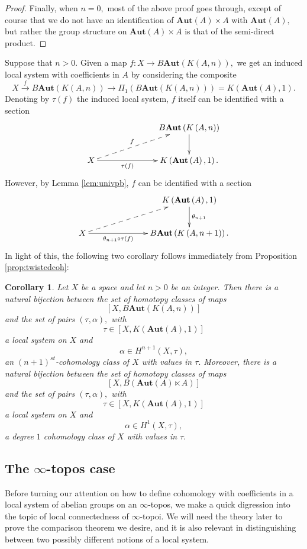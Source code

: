 \documentclass[12pt]{amsart}
\newtheorem{corollary}[dummy]{Corollary}
\theoremstyle{definition}
\renewcommand{\i}{\infty}
\def\Aut{\mathbf{Aut}}
\begin{document}
\begin{proof}
Finally, when $n=0,$ most of the above proof goes through, except of course that we do not have an identification of $\Aut\left(A\right) \times A$ with $\Aut\left(A\right),$ but rather the group structure on $\Aut\left(A\right) \times A$ is that of the semi-direct product.
\end{proof}

Suppose that $n>0.$ Given a map $f:X \to B\Aut\left(K\left(A,n\right)\right),$ we get an induced local system with coefficients in $A$ by considering the composite $$X \stackrel{f}{\longrightarrow} B\Aut\left(K\left(A,n\right)\right) \to \Pi_1\left(B\Aut\left(K\left(A,n\right)\right)\right)=K\left(\Aut\left(A\right),1\right).$$ Denoting by $\tau\left(f\right)$ the induced local system, $f$ itself can be identified with a section
$$\xymatrix@C=2.5cm{& B\Aut\left(K\left(A,n\right)\right)\ar[d]\\
X \ar@{-->}[ru]^-{f} \ar[r]_-{\tau\left(f\right)}& K\left(\Aut\left(A\right),1\right).}$$
However, by  Lemma \ref{lem:univpb}, $f$ can be identified with a section
$$\xymatrix@C=2.5cm{& K\left(\Aut\left(A\right),1\right) \ar[d]^-{\theta_{n+1}}\\
X \ar@{-->}[ru] \ar[r]_-{\theta_{n+1}\circ \tau\left(f\right)}& B\Aut\left(K\left(A,n+1\right)\right).}$$
In light of this, the following two corollary follows immediately from Proposition \ref{prop:twistedcoh}:

\begin{corollary}\label{cor:BAut rep 1}
Let $X$ be a space and let $n>0$ be an integer. Then there is a natural bijection between the set of homotopy classes of maps $$\left[X,B\Aut\left(K\left(A,n\right)\right)\right]$$ and the set of pairs $\left(\tau,\alpha\right),$ with $$\tau\in \left[X,K\left(\Aut\left(A\right),1\right)\right]$$ a local system on $X$ and $$\alpha \in H^{n+1}\left(X,\tau\right),$$ an $\left(n+1\right)^{st}$-cohomology class of $X$ with values in $\tau.$ Moreover, there is a natural bijection between the set of homotopy classes of maps $$\left[X,B\left(\Aut\left(A\right) \ltimes A\right)\right]$$ and the set of pairs $\left(\tau,\alpha\right),$ with $$\tau\in \left[X,K\left(\Aut\left(A\right),1\right)\right]$$ a local system on $X$ and $$\alpha \in H^{1}\left(X,\tau\right),$$ a degree $1$ cohomology class of $X$ with values in $\tau.$
\end{corollary}

\subsection{The $\i$-topos case}
Before turning our attention on how to define cohomology with coefficients in a local system of abelian groups on an $\i$-topos, we make a quick digression into the topic of local connectedness of $\i$-topoi. We will need the theory later to prove the comparison theorem we desire, and it is also relevant in distinguishing between two possibly different notions of a local system.
\end{document}

